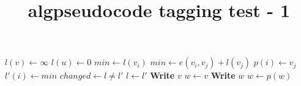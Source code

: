 \documentclass{article}
\title{algpseudocode tagging test - 1}
\begin{document}
\begin{algorithmic}[1]
\State $l(v) \leftarrow \infty$
\EndFor
\State $l(u) \leftarrow 0$
\Repeat
{}
\State $min \leftarrow l(v_i)$
\State $min \leftarrow e(v_i, v_j) + l(v_j)$
\State $p(i) \leftarrow v_j$
\EndIf
\EndFor
\State $l'(i) \leftarrow min$
\EndFor
\State $changed \leftarrow l \not= l'$
\State $l \leftarrow l'$
\EndProcedure
\Statex
{}
\State \textbf{Write} $v$
\Else
\State $w \leftarrow v$
\State \textbf{Write} $w$
\State $w \leftarrow p(w)$
\EndWhile
\EndIf
\EndProcedure
\end{algorithmic}
\end{document}
